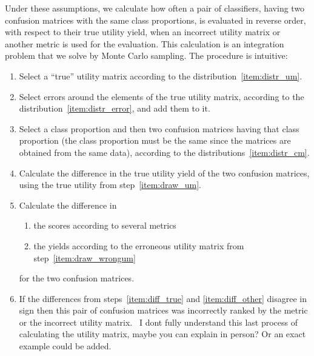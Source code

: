\documentclass[\ifafour a4paper,12pt,\else a5paper,10pt,\fi%
onecolumn,oneside,article,%
british%
]{memoir}
\theoremstyle{remark}
\theoremstyle{innote}
\newcommand*{\wrench}{{\fontencoding{U}\fontfamily{fontawesomethree}\selectfont\symbol{114}}}
\newcommand{\mynotew}[1]{{\footnotesize\color{notecolour}\wrench\ #1}}
\renewcommand*{\|}[1][]{\nonscript\:#1\vert\nonscript\:\mathopen{}}
\begin{document}
Under these assumptions, we calculate how often a pair of classifiers, having two confusion matrices with the same class proportions, is evaluated in reverse order, with respect to their true utility yield, when an incorrect utility matrix or another metric is used for the evaluation. This calculation is an integration problem that we solve by Monte Carlo sampling. The procedure is intuitive:
\begin{enumerate}[label=\arabic*.,ref=\arabic*]
\item\label{item:draw_um} Select a \enquote{true} utility matrix according to the distribution~\ref{item:distr_um}.
\item\label{item:draw_wrongum} Select errors around the elements of the true utility matrix, according to the distribution~\ref{item:distr_error}, and add them to it.
\item\label{item:draw_cm} Select a class proportion and then two confusion matrices having that class proportion (the class proportion must be the same since the matrices are obtained from the same data), according to the distributions~\ref{item:distr_cm}.
\item\label{item:diff_true} Calculate the difference in the true utility yield of the two confusion matrices, using the true utility from step~\ref{item:draw_um}.
\item\label{item:diff_other} Calculate the difference in
  \begin{enumerate}[label=\theenumi\alph*.]
  \item the scores according to several metrics
  \item the yields according to the erroneous utility matrix from step~\ref{item:draw_wrongum}
  \end{enumerate}
for the two confusion matrices.
\item If the differences from steps~\ref{item:diff_true} and \ref{item:diff_other} disagree in sign then this pair of confusion matrices was incorrectly ranked by the metric or the incorrect utility matrix. \mynotew{I dont fully understand this last process of calculating the utility matrix, maybe you can explain in person? Or an exact example could be added. }
\end{enumerate}
\end{document}
